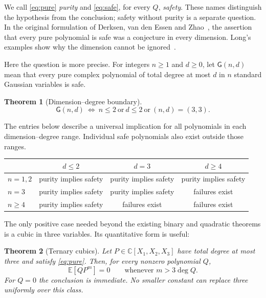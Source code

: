 \documentclass[11pt]{article}
\newtheorem{theorem}{Theorem}[section]
\theoremstyle{definition}\newtheorem{definition}[theorem]{Definition}
\theoremstyle{remark}\newtheorem{remark}[theorem]{Remark}
\newcommand{\E}{\mathbb E}
\newcommand{\C}{\mathbb C}
\newcommand{\G}{\mathsf G}
\begin{document}
We call \eqref{eq:pure} \emph{purity} and \eqref{eq:safe}, for every
$Q$, \emph{safety}. These names distinguish the hypothesis from the
conclusion; safety without purity is a separate question. In the original
formulation of Derksen, van den Essen and Zhao~\cite{DVEZ}, the assertion
that every pure polynomial is safe was a conjecture in every dimension.
Long's examples show why the dimension cannot be ignored~\cite{Long}.

Here the question is more precise. For integers $n\geq1$ and $d\geq0$,
let $\G(n,d)$ mean that every pure complex polynomial of total degree at
most $d$ in $n$ standard Gaussian variables is safe.

\begin{theorem}[Dimension--degree boundary]\label{thm:boundary}
\[
 \boxed{\quad \G(n,d)\ \Longleftrightarrow\
 n\leq2\ \text{or}\ d\leq2\ \text{or}\ (n,d)=(3,3).\quad}
\]
\end{theorem}

The entries below describe a universal implication for all polynomials
in each dimension--degree range. Individual safe polynomials also exist
outside those ranges.

\begin{center}
\begin{tabular}{@{}lccc@{}}
\toprule
 & $d\leq2$ & $d=3$ & $d\geq4$\\
\midrule
$n=1,2$ & purity implies safety & purity implies safety & purity implies safety\\
$n=3$ & purity implies safety & purity implies safety & failures exist\\
$n\geq4$ & purity implies safety & failures exist & failures exist\\
\bottomrule
\end{tabular}
\end{center}

The only positive case needed beyond the existing binary and quadratic
theorems is a cubic in three variables. Its quantitative form is useful:

\begin{theorem}[Ternary cubics]\label{thm:cubic}
Let $P\in\C[X_1,X_2,X_3]$ have total degree at most three and satisfy
\eqref{eq:pure}. Then, for every nonzero polynomial $Q$,
\begin{equation}\label{eq:cutoff}
 \E[QP^m]=0\qquad\text{whenever }m>3\deg Q.
\end{equation}
For $Q=0$ the conclusion is immediate. No smaller constant can replace
three uniformly over this class.
\end{theorem}
\end{document}
